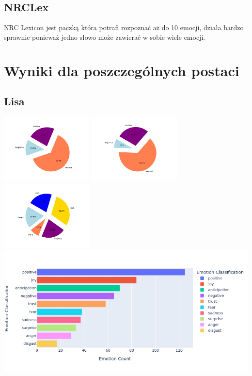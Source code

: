 \documentclass[a4paper,12pt]{article}
\begin{document}
	\subsection{NRCLex}
	NRC Lexicon jest paczką która potrafi rozpoznać aż do 10 emocji, działa bardzo sprawnie ponieważ jedno słowo może zawierać w sobie wiele emocji.
	\clearpage
	\section {Wyniki dla poszczególnych postaci}
	\subsection{Lisa}
	{\includegraphics[height=3.5cm]{lisasVaderEmotionalPie.png}}
	{\includegraphics[height=3.5cm]{lisasBlobEmotionalPie.png}}
	{\includegraphics[height=3.5cm]{lisasEmotionalPie.png}}\\
	{\includegraphics[width=17cm]{lisaNrcImage.png}}\\
	\clearpage
\end{document}
